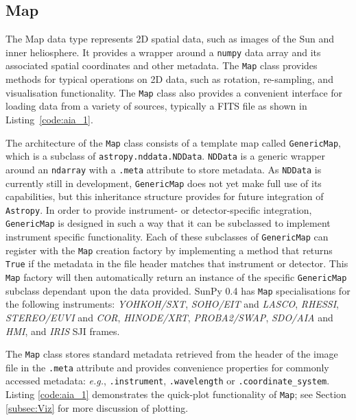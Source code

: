 \subsection{Map}\label{ssec:map}
The Map data type represents 2D spatial data, such as images of the Sun and 
inner heliosphere. It provides a wrapper around a \texttt{numpy} data array and 
its associated spatial coordinates and other metadata. The \texttt{Map} class 
provides methods for typical operations on 2D data, such as rotation, 
re-sampling, and visualisation functionality.
The \texttt{Map} class also provides a convenient interface for loading data 
from a variety of sources, typically a FITS file as shown in 
Listing~\ref{code:aia_1}.

The architecture of the \texttt{Map} class consists of a template map called
\texttt{GenericMap}, which is a subclass of \texttt{astropy.nddata.NDData}. 
\texttt{NDData} is a generic wrapper around an \texttt{ndarray} with a 
\texttt{.meta} attribute to store metadata.
As \texttt{NDData} is currently still in development, \texttt{GenericMap} does 
not yet make full use of its capabilities, but this inheritance structure 
provides for future integration of \texttt{Astropy}. In order to provide 
instrument- or detector-specific integration, \texttt{GenericMap} is designed 
in such a way that it can be subclassed to implement instrument specific 
functionality. Each of these subclasses of \texttt{GenericMap} can register 
with the \texttt{Map} creation factory by implementing a method that returns 
\texttt{True} if the metadata in the file header matches that instrument or 
detector.  This \texttt{Map} factory will then automatically return an instance 
of the specific \texttt{GenericMap} subclass dependant upon the data provided. 
SunPy 0.4 has \texttt{Map} specialisations for the following instruments: 
\textit{YOHKOH/SXT}, \textit{SOHO/EIT} and \textit{LASCO}, \textit{RHESSI}, 
\textit{STEREO/EUVI} and \textit{COR}, \textit{HINODE/XRT},
\textit{PROBA2/SWAP}, \textit{SDO/AIA} and \textit{HMI}, 
and \textit{IRIS} SJI frames. 

The \texttt{Map} class stores standard metadata retrieved from the header of 
the image file in the \texttt{.meta} attribute and provides convenience 
properties for commonly accessed metadata: \textit{e.g.}, \texttt{.instrument}, 
\texttt{.wavelength} or \texttt{.coordinate\_system}. 
Listing \ref{code:aia_1} demonstrates the quick-plot functionality of 
\texttt{Map}; see Section \ref{subsec:Viz} for more discussion of plotting.

